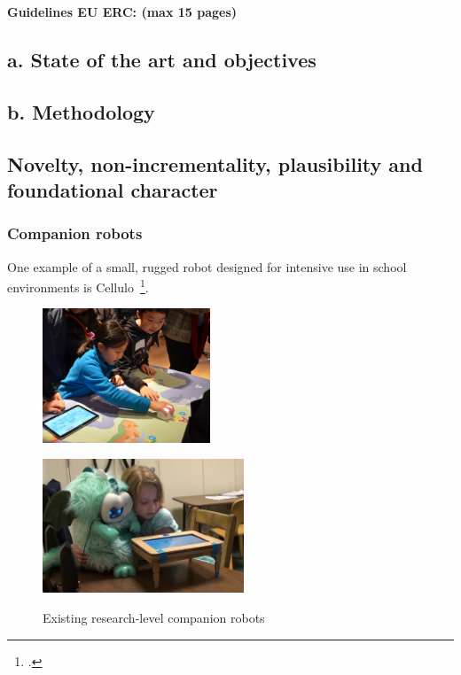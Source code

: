 \documentclass[11pt]{article}
\newcommand{\eu}[1]{{\color{teal}\textbf{Guidelines EU ERC: #1}}}
\begin{document}
\eu{(max 15 pages)}

\hypertarget{a.-state-of-the-art-and-objectives}{%
\subsection{a. State of the art and
objectives}\label{a.-state-of-the-art-and-objectives}}

\hypertarget{b.-methodology}{%
\subsection{b. Methodology}\label{b.-methodology}}

\subsection{Novelty, non-incrementality, plausibility and foundational character}

\subsubsection{Companion robots}

One example of a small, rugged robot designed for intensive use in school
environments is Cellulo~\footcite{ozgur2017cellulo}.

\begin{figure}[!htbp]
    \begin{minipage}[b]{.3\linewidth}
        \centering\includegraphics[height=4cm]{figs/cellulo.jpg}
        \label{fig:cellulo}
    \end{minipage}%
    \hspace{0.5cm}
    \begin{minipage}[b]{.3\linewidth}
        \centering
        \includegraphics[height=4cm]{figs/tega.jpg}
        \label{fig:tega}
    \end{minipage}
    \hspace{0.5cm}
    \begin{minipage}[b]{.3\linewidth}
        \centering
        \label{fig:ono}
    \end{minipage}
    \caption{Existing research-level companion robots}\label{fig:research-robots}
\end{figure}
\end{document}

